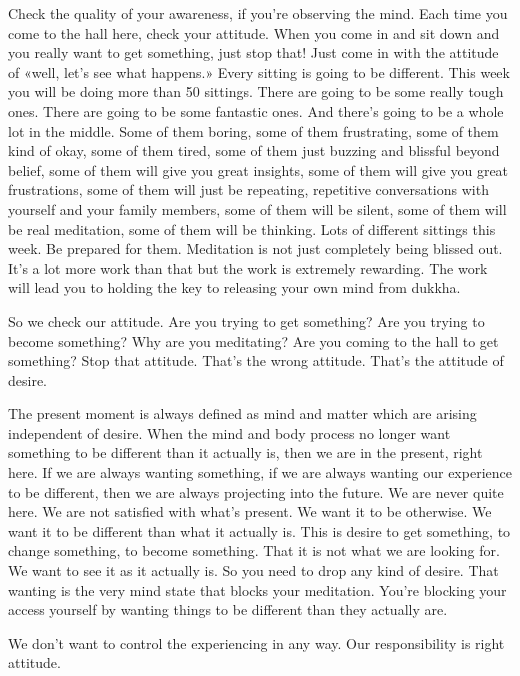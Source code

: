 \documentclass[letterpaper,10pt,english]{sphinxmanual}
\begin{document}
\sphinxAtStartPar
Check  the  quality  of  your  awareness,  if  you’re  observing  the  mind.
Each time you come to the hall here, check your attitude. When you come in
and sit down and you really want to get something, just stop that! Just come
in with the attitude of «well, let’s see what happens.» Every sitting is going
to be different. This week you will be doing more than 50 sittings. There are
going  to  be  some  really  tough  ones. There  are  going  to  be  some  fantastic
ones. And there’s going to be a whole lot in the middle. Some of them boring,
   some of them frustrating, some of them kind of okay, some of them tired,
some of them just buzzing and blissful beyond belief, some of them will give
you great insights, some of them will give you great frustrations, some of
them will just be repeating, repetitive conversations with yourself and your
family members, some of them will be silent, some of them will be real meditation, some of them will be thinking. Lots of different sittings this week.
Be prepared for them. Meditation is not just completely being blissed out.
It’s a lot more work than that but the work is extremely rewarding. The work
will lead you to holding the key to releasing your own mind from dukkha.

\sphinxAtStartPar
So we check our attitude. Are you trying to get something? Are you
trying to become something? Why are you meditating? Are you coming to
the hall to get something? Stop that attitude. That’s the wrong attitude. That’s
the attitude of desire.

\sphinxAtStartPar
The present moment is always defined as mind and matter which are
arising independent of desire. When the mind and body process no longer
want something to be different than it actually is, then we are in the present,
right here. If we are always wanting something, if we are always wanting
our experience to be different, then we are always projecting into the future.
We are never quite here. We are not satisfied with what’s present. We want
it to be otherwise. We want it to be different than what it actually is. This is
desire to get something, to change something, to become something. That it
is not what we are looking for. We want to see it as it actually is. So you need
to drop any kind of desire. That wanting is the very mind state that blocks
your meditation. You’re blocking your access yourself by wanting things to
be different than they actually are.

\sphinxAtStartPar
We don’t want to control the experiencing in any way. Our responsibility is right attitude.
\end{document}
